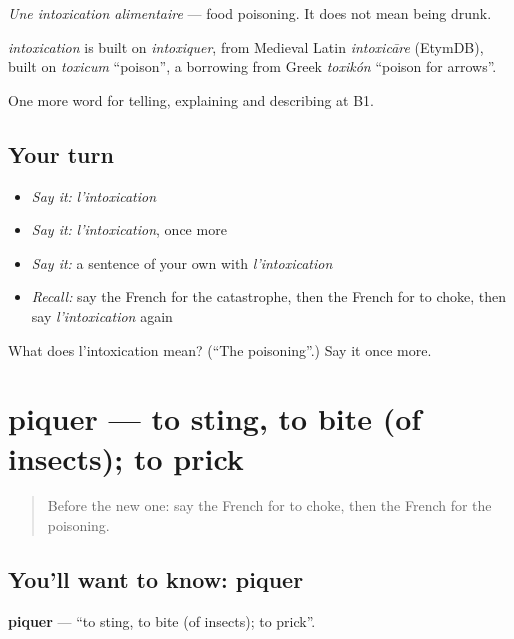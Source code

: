 \emph{Une intoxication alimentaire} — food poisoning. It does not mean being drunk.

\begin{cousinweb}
\emph{intoxication} is built on \emph{intoxiquer}, from Medieval Latin \emph{intoxicāre} (EtymDB), built on \emph{toxicum} \textquotedblleft{}poison\textquotedblright{}, a borrowing from Greek \emph{toxikón} \textquotedblleft{}poison for arrows\textquotedblright{}.
\end{cousinweb}

\begin{grammarlens}[title={What you've built}]
One more word for telling, explaining and describing at B1.
\end{grammarlens}

\subsection*{Your turn}
\begin{itemize}
\raggedright
  \item \emph{Say it:} \emph{l'intoxication}
  \item \emph{Say it:} \emph{l'intoxication}, once more
  \item \emph{Say it:} a sentence of your own with \emph{l'intoxication}
  \item \emph{Recall:} say the French for the catastrophe, then the French for to choke, then say \emph{l'intoxication} again
\end{itemize}

\begin{tcolorbox}[breakable,colback=teal!4,colframe=teal!35!black,title={Before you move on}]
What does l'intoxication mean? (\textquotedblleft{}The poisoning\textquotedblright{}.) Say it once more.
\end{tcolorbox}
\section[piquer]{piquer — to sting, to bite (of insects); to prick}

\label{lesson:FR-C306-piquer}



\begin{quote}
Before the new one: say the French for to choke, then the French for the poisoning.
\end{quote}

\subsection*{You'll want to know: piquer}
\textbf{piquer} — \textquotedblleft{}to sting, to bite (of insects); to prick\textquotedblright{}.

